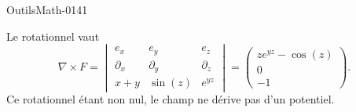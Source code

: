 
\begin{corrige}{OutilsMath-0141}

    Le rotationnel vaut
    \begin{equation}
        \nabla\times F=\begin{vmatrix}
            e_x    &   e_y    &   e_z    \\
            \partial_x    &   \partial_y    &   \partial_z    \\
            x+y    &   \sin(z)    &    e^{yz}
        \end{vmatrix}=\begin{pmatrix}
            z e^{yz}-\cos(z)    \\ 
            0    \\ 
            -1    
        \end{pmatrix}.
    \end{equation}
    Ce rotationnel étant non nul, le champ ne dérive pas d'un potentiel.

\end{corrige}
